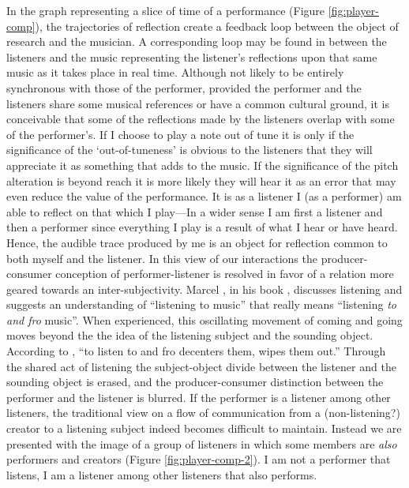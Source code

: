In the graph representing a slice of time of a performance (Figure \ref{fig:player-comp}), the trajectories of reflection create a feedback loop between the object of research and the musician. A corresponding loop may be found in between the listeners and the music representing the listener's reflections upon that same music as it takes place in real time. Although not likely to be entirely synchronous with those of the performer, provided the performer and the listeners share some musical references or have a common cultural ground, it is conceivable that some of the reflections made by the listeners overlap with some of the performer's. If I choose to play a note out of tune it is only if the significance of the `out-of-tuneness' is obvious to the listeners that they will appreciate it as something that adds to the music. If the significance of the pitch alteration is beyond reach it is more likely they will hear it as an error that may even reduce the value of the performance. It is as a listener I (as a performer) am able to reflect on that which I play---In a wider sense I am first a listener and then a performer since everything I play is a result of what I hear or have heard. Hence, the audible trace produced by me is an object for reflection common to both myself and the listener. In this view of our interactions the producer-consumer conception of performer-listener is resolved in favor of a relation more geared towards an  inter-subjectivity. Marcel \citeauthor{cobussen08}, in his book , discusses listening and suggests an understanding of ``listening to music'' that really means ``listening \emph{to and fro} music''. \parencite[p. 135 (italics by the author)]{cobussen08} When experienced, this oscillating movement of coming and going moves beyond the the idea of the listening subject and the sounding object. According to \citeauthor{cobussen08}, ``to listen to and fro decenters them, wipes them out.'' \parencite[135]{cobussen08} Through the shared act of listening the subject-object divide between the listener and the sounding object is erased, and the producer-consumer distinction between the performer and the listener is blurred. 
If the performer is a listener among other listeners, the traditional view on a flow of communication from a (non-listening?) creator to a listening subject indeed becomes difficult to maintain. Instead we are presented with the image of a group of listeners in which some members are \emph{also} performers and creators (Figure \ref{fig:player-comp-2}). I am not a performer that listens, I am a listener among other listeners that also performs. 

